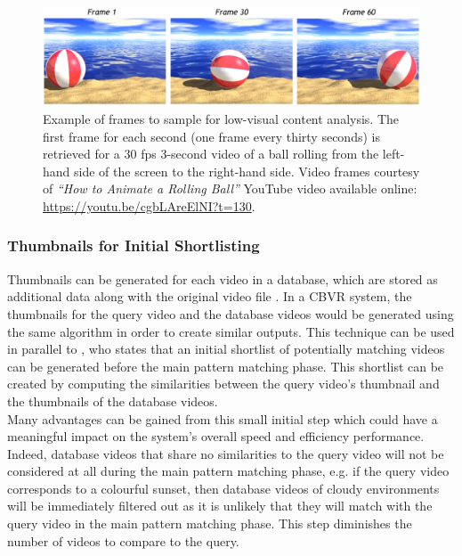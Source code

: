 \begin{figure}[h]
\centerline{\includegraphics[width=\textwidth]{figures/litsurvey/ball_rolling.jpg}}
\caption{\label{fig:rolling_ball}Example of frames to sample for low-visual content analysis. The first frame for each second (one frame every thirty seconds) is retrieved for a 30 fps 3-second video of a ball rolling from the left-hand side of the screen to the right-hand side. Video frames courtesy of \textit{``How to Animate a Rolling Ball''} YouTube video available online: \url{https://youtu.be/cgbLAreElNI?t=130}.}
\end{figure}

\subsubsection{Thumbnails for Initial Shortlisting}

Thumbnails can be generated for each video in a database, which are stored as additional data along with the original video file \cite{okabe2018animating}. In a CBVR system, the thumbnails for the query video and the database videos would be generated using the same algorithm in order to create similar outputs. This technique can be used in parallel to \cite{araujo2017i2v}, who states that an initial shortlist of potentially matching videos can be generated before the main pattern matching phase. This shortlist can be created by computing the similarities between the query video's thumbnail and the thumbnails of the database videos.\\

Many advantages can be gained from this small initial step which could have a meaningful impact on the system's overall speed and efficiency performance. Indeed, database videos that share no similarities to the query video will not be considered at all during the main pattern matching phase, e.g. if the query video corresponds to a colourful sunset, then database videos of cloudy environments will be immediately filtered out as it is unlikely that they will match with the query video in the main pattern matching phase. This step diminishes the number of videos to compare to the query.\\

